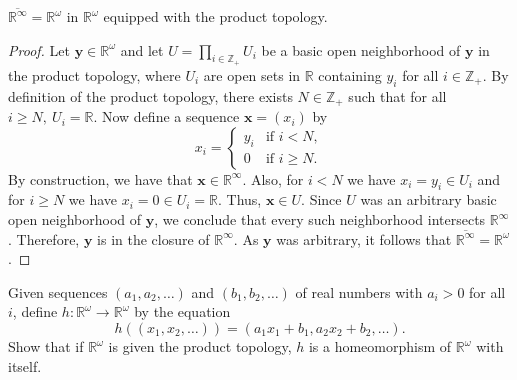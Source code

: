 \documentclass[a4paper,10pt]{article}
\newcommand{\bx}{\mathbf{x}}
\newcommand{\by}{\mathbf{y}}
\newcommand{\RR}{\mathbb{R}}
\begin{document}
\begin{solution}
      $\overline{\mathbb{R}^\infty} = \mathbb{R}^\omega$ in $\mathbb{R}^\omega$ equipped with the product topology.
    \begin{proof}
        Let $\mathbf{y} \in \mathbb{R}^\omega$ and let $U = \prod_{i\in\mathbb{Z}_+} U_i$ be a basic open neighborhood of $\mathbf{y}$ in the product topology, where $U_i$ are open sets in $\mathbb{R}$ containing $y_i$ for all $i \in \mathbb{Z}_+$.
        By definition of the product topology, there exists $N \in \mathbb{Z}_+$ such that for all $i \geq N,~ U_i = \mathbb{R}$.
        Now define a sequence $\mathbf{x} = (x_i)$ by
        \begin{equation*}
            x_i = \begin{cases}
                y_i & \text{if } i < N, \\
                0   & \text{if } i \geq N.
            \end{cases}
        \end{equation*}
        By construction, we have that $\mathbf{x} \in \mathbb{R}^\infty$.
        Also, for $i < N$ we have $x_i = y_i \in U_i$ and for $i \geq N$ we have $x_i = 0 \in U_i = \RR$.
        Thus, $\bx \in U$.
        Since $U$ was an arbitrary basic open neighborhood of $\by$, we conclude that every such neighborhood intersects $\RR^\infty$.
        Therefore, $\by$ is in the closure of $\RR^\infty$.
        As $\by$ was arbitrary, it follows that $\overline{\RR^\infty} = \RR^\omega$.
    \end{proof}
\end{solution}
\newpage

\begin{exercise}[ID=2.19.8]
    Given sequences $(a_1, a_2, \ldots)$ and $(b_1, b_2, \ldots)$ of real numbers with $a_i > 0$ for all $i$, define $h: \RR^\omega \rightarrow \RR^\omega$ by the equation
    \begin{equation*}
        h((x_1, x_2, \ldots)) = (a_1 x_1 + b_1, a_2 x_2 + b_2, \ldots).
    \end{equation*}
    Show that if $\RR^\omega$ is given the product topology, $h$ is a homeomorphism of $\RR^\omega$ with itself.
\end{exercise}
\end{document}
